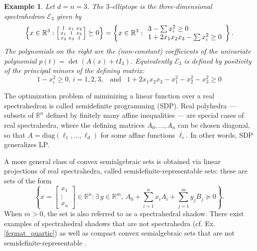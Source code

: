 \documentclass[sigconf]{acmart}
\newcommand{\R}{\mathbb{R}} %
\newtheorem{example}[theorem]{Example}
\def\diag{\mathrm{diag}}
\begin{document}
\begin{example}\label{ell3}
  Let $d=n=3$. The $3$-elliptope is the three-di\-men\-sio\-nal spectrahedron
  $\mathcal{E}_3$ given by
  $$
  \left\{
  x
  \in \R^3 :
  \left[
  \begin{smallmatrix}
    1 & x_1 & x_2 \\
    x_1 & 1 & x_3 \\
    x_2 & x_3 & 1
  \end{smallmatrix}
  \right]
  \succeq 0
  \right\}
  =
  \left\{
  x
  \in \R^3 :
  \begin{array}{l}
    {\footnotesize 3-\sum x_i^2 \geq 0} \\
    {\footnotesize 1+2x_1x_2x_3-\sum x_i^2 \geq 0}
  \end{array}
  \right\}.
  $$
  The polynomials on the right are the (non-constant) coefficients of the
  univariate polynomial $p(t) = \det(A(x)+t I_3)$. Equivalently $\mathcal{E}_3$
  is defined by positivity of the principal minors of the defining matrix:
  $$
  1-x_i^2 \geq 0, \, i=1,2,3, \,\,\, \text{ and } \,\,\,
  1+2x_1x_2x_3-x_1^2-x_2^2-x_3^2 \geq 0
  $$
\end{example}

The optimization problem of miminizing a linear function over a real spectrahedron
is called {semidefinite programming} (SDP).
{Real polyhedra} --- subsets of $\R^n$ defined by finitely many affine inequalities --- are special cases of real
spectrahedra, where the defining matrices $A_0, \ldots, A_n$ can be chosen diagonal, so that
$A = \diag(\ell_1,\ldots, \ell_d)$ for some affine functions $\ell_i$. In other words, SDP generalizes LP.

A more general class of convex semialgebraic sets is obtained via linear projections of real spectrahedra,
called semidefinite-re\-pre\-sen\-ta\-ble sets: these are sets of the form
$$
\left\{x = \left[\begin{smallmatrix} x_1 \\ \vdots \\ x_n \end{smallmatrix}\right] \in \R^n : \exists\,y\in\R^m, \, A_0 + \sum_{i=1}^n x_i A_i + \sum_{j=1}^m y_j B_j \succeq 0\right\}.
$$
When $m>0$, the set is also referred to as a spectrahedral shadow. There exist examples of
spectrahedral shadows that are not spectrahedra (cf. Ex. \ref{fermat_quartic}) as well as compact
convex semialgebraic sets that are not semidefinite-representable \cite{scheiderer_spectrahedral_2017}.
\end{document}
